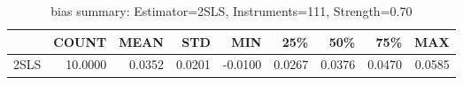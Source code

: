 \begin{table}[ht]
\centering
\caption{bias summary: Estimator=2SLS, Instruments=111, Strength=0.70}
\begin{tabular}{lrrrrrrrr}
\toprule
 & COUNT & MEAN & STD & MIN & 25\% & 50\% & 75\% & MAX \\
\midrule
2SLS & 10.0000 & 0.0352 & 0.0201 & -0.0100 & 0.0267 & 0.0376 & 0.0470 & 0.0585 \\
\bottomrule
\end{tabular}
\end{table}

